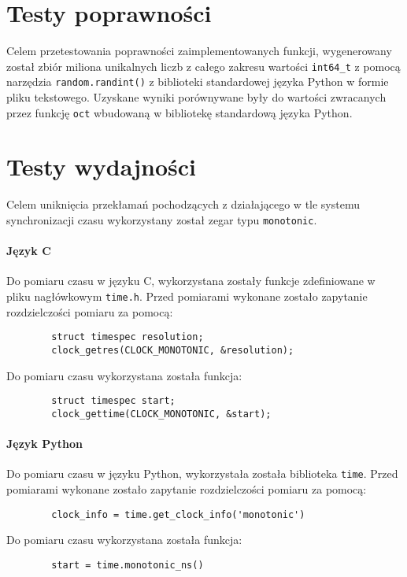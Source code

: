 \documentclass[11pt]{article}
\begin{document}
	\section{Testy poprawności}
	Celem przetestowania poprawności zaimplementowanych funkcji, 
	wygenerowany został zbiór miliona unikalnych liczb z całego zakresu wartości \texttt{int64\_t} 
	z pomocą narzędzia \texttt{random.randint()} z biblioteki standardowej języka Python w formie pliku tekstowego.
	Uzyskane wyniki porównywane były do wartości zwracanych przez funkcję \texttt{oct} wbudowaną w bibliotekę
	standardową języka Python.
	
	\section{Testy wydajności}
		Celem uniknięcia przekłamań pochodzących z działającego w tle systemu synchronizacji czasu
		wykorzystany został zegar typu \texttt{monotonic}.

		\paragraph{Język C}
		Do pomiaru czasu w języku C, wykorzystana zostały funkcje zdefiniowane w pliku nagłówkowym \texttt{time.h}.
		Przed pomiarami wykonane zostało zapytanie rozdzielczości pomiaru za pomocą:
		\begin{lstlisting}
		struct timespec resolution;
		clock_getres(CLOCK_MONOTONIC, &resolution);
		\end{lstlisting}
		Do pomiaru czasu wykorzystana została funkcja:
		\begin{lstlisting}
		struct timespec start;
		clock_gettime(CLOCK_MONOTONIC, &start);
		\end{lstlisting}

		\paragraph{Język Python}
		Do pomiaru czasu w języku Python, wykorzystała została biblioteka \lstinline{time}.
		Przed pomiarami wykonane zostało zapytanie rozdzielczości pomiaru za pomocą:
		\begin{lstlisting}
		clock_info = time.get_clock_info('monotonic')
		\end{lstlisting}
		Do pomiaru czasu wykorzystana została funkcja:
		\begin{lstlisting}
		start = time.monotonic_ns()
		\end{lstlisting}
\end{document}
